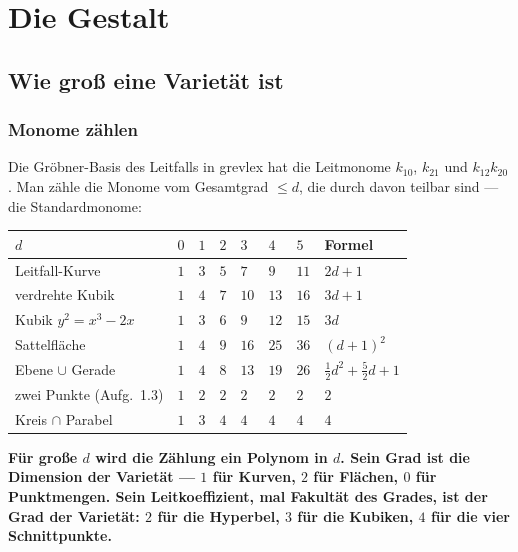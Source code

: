 \part{Die Gestalt}

\chapter{Wie groß eine Varietät ist}

\section{Monome zählen}

\begin{merksatz}
Die Gröbner-Basis des Leitfalls in grevlex hat die Leitmonome $k_{10}$, $k_{21}$ und $k_{12}k_{20}$. Man zähle die Monome vom Gesamtgrad $\le d$, die durch  davon teilbar sind --- die Standardmonome:

\begin{center}
{\small
\renewcommand{\arraystretch}{1.46}
\begin{tabular}{@{}P{3.0cm}P{0.7cm}P{0.7cm}P{0.7cm}P{0.7cm}P{0.7cm}P{0.7cm}P{1.2cm}@{}}
\toprule
$d$ & $0$ & $1$ & $2$ & $3$ & $4$ & $5$ & \textbf{Formel}\\
\midrule
Leitfall-Kurve & $1$ & $3$ & $5$ & $7$ & $9$ & $11$ & $2d + 1$\\
verdrehte Kubik & $1$ & $4$ & $7$ & $10$ & $13$ & $16$ & $3d + 1$\\
Kubik $y^{2} = x^{3} - 2x$ & $1$ & $3$ & $6$ & $9$ & $12$ & $15$ & $3d$\\
Sattelfläche & $1$ & $4$ & $9$ & $16$ & $25$ & $36$ & $(d+1)^{2}$\\
Ebene $\cup$ Gerade & $1$ & $4$ & $8$ & $13$ & $19$ & $26$ & $\tfrac12d^{2} + \tfrac52d + 1$\\
zwei Punkte (Aufg.~1.3) & $1$ & $2$ & $2$ & $2$ & $2$ & $2$ & $2$\\
Kreis $\cap$ Parabel & $1$ & $3$ & $4$ & $4$ & $4$ & $4$ & $4$\\
\bottomrule
\end{tabular}}
\end{center}

\begin{center}
\begin{minipage}{0.9\textwidth}
\textbf{Für große $d$ wird die Zählung ein Polynom in $d$. Sein Grad ist die Dimension der Varietät --- $1$ für Kurven, $2$ für Flächen, $0$ für Punktmengen. Sein Leitkoeffizient, mal Fakultät des Grades, ist der Grad der Varietät: $2$ für die Hyperbel, $3$ für die Kubiken, $4$ für die vier Schnittpunkte.}
\end{minipage}
\end{center}


\end{merksatz}
